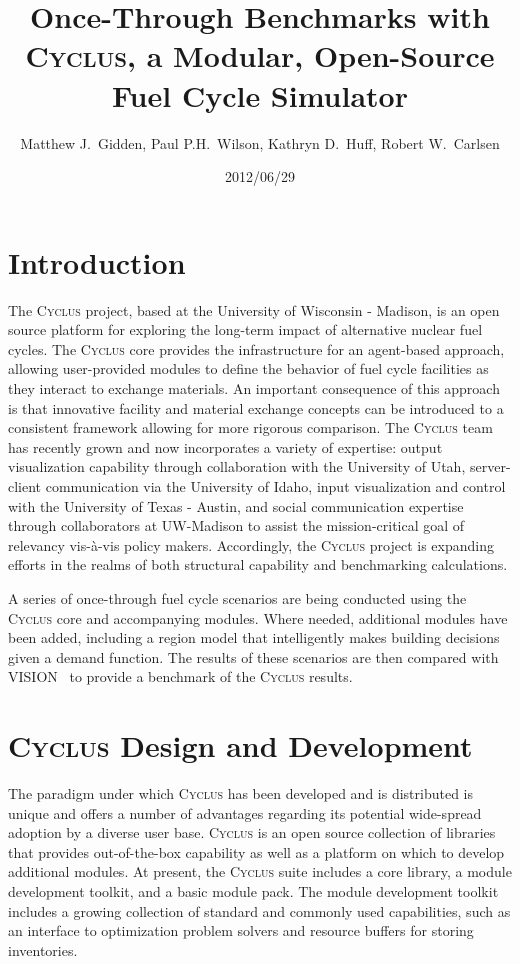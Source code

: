 \documentclass{anstrans}
\title{Once-Through Benchmarks with \textsc{Cyclus}, a Modular, Open-Source Fuel Cycle Simulator}
\author{Matthew J.~Gidden, Paul P.H.~Wilson, Kathryn D.~Huff, Robert W.~Carlsen}
\institute{Department of Nuclear Engineering \& Engineering Physics, University of Wisconsin - Madison, Madison, WI, 53703}
\date{2012/06/29}
\begin{document}
\section{Introduction}
The \textsc{Cyclus} project, based at the University of Wisconsin -
Madison, is an open source platform for exploring the long-term impact
of alternative nuclear fuel cycles.  The \textsc{Cyclus} core provides
the infrastructure for an agent-based approach, allowing user-provided
modules to define the behavior of fuel cycle facilities as they
interact to exchange materials.  An important consequence of this
approach is that innovative facility and material exchange concepts
can be introduced to a consistent framework allowing for more rigorous
comparison.  The \textsc{Cyclus} team has recently grown and now
incorporates a variety of expertise: output visualization capability
through collaboration with the University of Utah, server-client
communication via the University of Idaho, input visualization and
control with the University of Texas - Austin, and social
communication expertise through collaborators at UW-Madison to assist
the mission-critical goal of relevancy vis-\`{a}-vis policy
makers. Accordingly, the \textsc{Cyclus} project is expanding efforts in
the realms of both structural capability and benchmarking
calculations.

A series of once-through fuel cycle scenarios are being conducted
using the \textsc{Cyclus} core and accompanying modules. Where needed,
additional modules have been added, including a region model that intelligently makes building decisions 
given a demand function. The results of these scenarios are then compared with
VISION~\cite{vision2009} to provide a benchmark of the \textsc{Cyclus}
results.

\section{\textsc{Cyclus} Design and Development}
The paradigm under which \textsc{Cyclus} has been developed and is
distributed is unique and offers a number of advantages regarding its
potential wide-spread adoption by a diverse user base. \textsc{Cyclus}
is an open source collection of libraries that provides
out-of-the-box capability as well as a platform on which to develop
additional modules. At present, the \textsc{Cyclus} suite includes a
core library, a module development toolkit, and a basic module pack.
The module development toolkit includes a growing collection of
standard and commonly used capabilities, such as an interface to optimization 
problem solvers and resource buffers for storing inventories.
\end{document}

